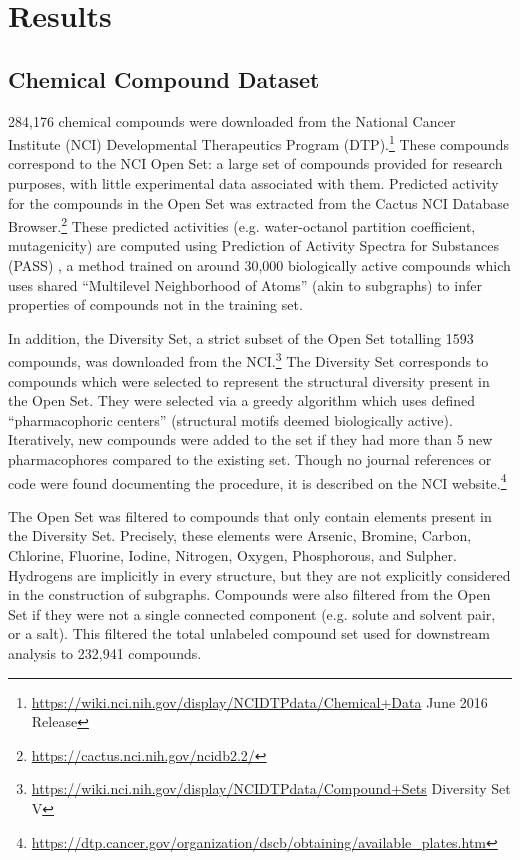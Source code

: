 \section{Results}

\subsection{Chemical Compound Dataset}
284,176 chemical compounds were downloaded from the National Cancer Institute (NCI) Developmental Therapeutics Program (DTP).\footnote{\url{https://wiki.nci.nih.gov/display/NCIDTPdata/Chemical+Data} June 2016 Release} These compounds correspond to the NCI Open Set: a large set of compounds provided for research purposes, with little experimental data associated with them. Predicted activity for the compounds in the Open Set was extracted from the Cactus NCI Database Browser.\footnote{\url{https://cactus.nci.nih.gov/ncidb2.2/}} These predicted activities (e.g. water-octanol partition coefficient, mutagenicity) are computed using Prediction of Activity Spectra for Substances (PASS) \cite{Lagunin2000}, a method trained on around 30,000 biologically active compounds which uses shared ``Multilevel Neighborhood of Atoms'' (akin to subgraphs) to infer properties of compounds not in the training set.

In addition, the Diversity Set, a strict subset of the Open Set totalling 1593 compounds, was downloaded from the NCI.\footnote{\url{https://wiki.nci.nih.gov/display/NCIDTPdata/Compound+Sets} Diversity Set V} The Diversity Set corresponds to compounds which were selected to represent the structural diversity present in the Open Set. They were selected via a greedy algorithm which uses defined ``pharmacophoric centers'' (structural motifs deemed biologically active). Iteratively, new compounds were added to the set if they had more than 5 new pharmacophores compared to the existing set. Though no journal references or code were found documenting the procedure, it is described on the NCI website.\footnote{\url{https://dtp.cancer.gov/organization/dscb/obtaining/available_plates.htm}}

The Open Set was filtered to compounds that only contain elements present in the Diversity Set. Precisely, these elements were Arsenic, Bromine, Carbon, Chlorine, Fluorine, Iodine, Nitrogen, Oxygen, Phosphorous, and Sulpher. Hydrogens are implicitly in every structure, but they are not explicitly considered in the construction of subgraphs. Compounds were also filtered from the Open Set if they were not a single connected component (e.g. solute and solvent pair, or a salt). This filtered the total unlabeled compound set used for downstream analysis to 232,941 compounds.


